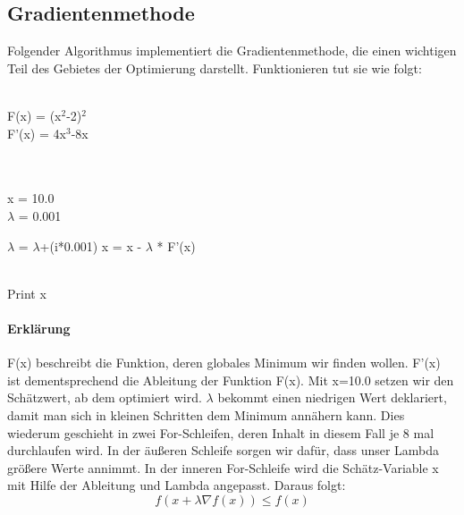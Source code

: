 \subsection{Gradientenmethode}

Folgender Algorithmus implementiert die Gradientenmethode, die einen wichtigen 
Teil des Gebietes der Optimierung darstellt. Funktionieren tut sie wie folgt:
\begin{algorithmic}[1]

   \\F(x) = (x$^2$-2)$^2$
\\F'(x) = 4x$^3$-8x

\\
\\x = 10.0
\\$\lambda$ = 0.001

 \State $\lambda$ = $\lambda$+(i*0.001)
    \State x = x - $\lambda$ * F'(x)
  \EndFor
\EndFor
 
 
\\Print x\EndProcedure
\Statex
\end{algorithmic}

\paragraph{Erklärung}
F(x) beschreibt die Funktion, deren globales Minimum wir finden wollen.
F'(x) ist dementsprechend die Ableitung der Funktion F(x).
Mit x=10.0 setzen wir den Schätzwert, ab dem optimiert wird. 
$\lambda$ bekommt einen niedrigen Wert deklariert, damit
man sich in kleinen Schritten dem Minimum annähern kann.
Dies wiederum geschieht in zwei For-Schleifen, deren Inhalt
 in diesem Fall je 8 mal durchlaufen wird.
 In der äußeren Schleife sorgen wir dafür, dass unser Lambda größere Werte annimmt.
 In der inneren For-Schleife wird die Schätz-Variable x mit Hilfe der Ableitung 
 und Lambda angepasst.
 Daraus folgt:
 \\
\begin{equation*}
 f(x+\lambda \nabla f(x)) \leq f(x)
 \end{equation*}

